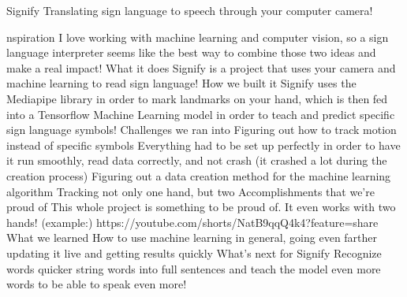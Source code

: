 Signify
Translating sign language to speech through your computer camera!

nspiration
I love working with machine learning and computer vision, so a sign language interpreter seems like the best way to combine those two ideas and make a real impact!
What it does
Signify is a project that uses your camera and machine learning to read sign language!
How we built it
Signify uses the Mediapipe library in order to mark landmarks on your hand, which is then fed into a Tensorflow Machine Learning model in order to teach and predict specific sign language symbols!
Challenges we ran into
Figuring out how to track motion instead of specific symbols
Everything had to be set up perfectly in order to have it run smoothly, read data correctly, and not crash (it crashed a lot during the creation process)
Figuring out a data creation method for the machine learning algorithm Tracking not only one hand, but two
Accomplishments that we're proud of
This whole project is something to be proud of.
It even works with two hands!
(example:) https://youtube.com/shorts/NatB9qqQ4k4?feature=share
What we learned
How to use machine learning in general, going even farther updating it live and getting results quickly
What's next for Signify
Recognize words quicker
string words into full sentences
and teach the model even more words to be able to speak even more!
